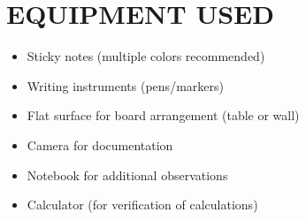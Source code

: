 \chapter{EQUIPMENT USED}
\label{ch:eqp_used}
\begin{itemize}
    \item Sticky notes (multiple colors recommended)
    \item Writing instruments (pens/markers)
    \item Flat surface for board arrangement (table or wall)
    \item Camera for documentation
    \item Notebook for additional observations
    \item Calculator (for verification of calculations)
\end{itemize}


